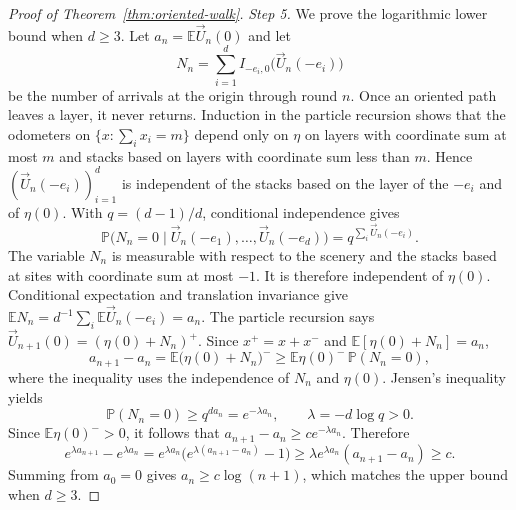 \documentclass[11pt]{amsart}
\theoremstyle{plain}
\theoremstyle{definition}
\newcommand{\E}{\mathbb{E}}
\renewcommand{\P}{\mathbb{P}}
\begin{document}
\begin{proof}[Proof of Theorem~\ref{thm:oriented-walk}]
	\smallskip
	\noindent\emph{Step 5.} We prove the logarithmic lower bound when $d\geq3$.
	Let $a_n=\E \vec U_n(0)$ and let
	\[
		N_n=\sum_{i=1}^{d}I_{-e_i,0}\bigl(\vec U_n(-e_i)\bigr)
	\]
	be the number of arrivals at the origin through round $n$. Once an oriented
	path leaves a layer, it never returns. Induction in the particle recursion shows
	that the odometers on $\{x:\sum_i x_i=m\}$ depend only on $\eta$
	on layers with coordinate sum at most $m$ and stacks based on layers with
	coordinate sum less than $m$. Hence
	$(\vec U_n(-e_i))_{i=1}^{d}$ is independent of the stacks based on the layer
	of the $-e_i$ and of $\eta(0)$. With $q=(d-1)/d$, conditional independence gives
	\[
		\P\bigl(N_n=0\mid \vec U_n(-e_1),\ldots,\vec U_n(-e_d)\bigr)
		=q^{\sum_i\vec U_n(-e_i)}.
	\]
	The variable $N_n$ is measurable with respect to the scenery and the stacks
	based at sites with coordinate sum at most $-1$. It is therefore independent
	of $\eta(0)$.
	Conditional expectation and translation invariance give
	$\E N_n=d^{-1}\sum_i\E \vec U_n(-e_i)=a_n$. The particle recursion says
	$\vec U_{n+1}(0)=(\eta(0)+N_n)^+$. Since $x^+=x+x^-$ and
	$\E[\eta(0)+N_n]=a_n$,
	\[
		a_{n+1}-a_n
		=\E\bigl(\eta(0)+N_n\bigr)^-
		\geq \E\eta(0)^-\,\P(N_n=0),
	\]
	where the inequality uses the independence of $N_n$ and $\eta(0)$.
	Jensen's inequality yields
	\[
		\P(N_n=0)\geq q^{da_n}=e^{-\lambda a_n},
		\qquad \lambda=-d\log q>0.
	\]
	Since $\E\eta(0)^->0$, it follows that
	$a_{n+1}-a_n\geq ce^{-\lambda a_n}$. Therefore
	\[
		e^{\lambda a_{n+1}}-e^{\lambda a_n}
		=e^{\lambda a_n}\bigl(e^{\lambda(a_{n+1}-a_n)}-1\bigr)
		\geq \lambda e^{\lambda a_n}(a_{n+1}-a_n)\geq c.
	\]
	Summing from $a_0=0$ gives $a_n\geq c\log(n+1)$, which matches the upper
	bound when $d\geq3$.
\end{proof}



\end{document}
